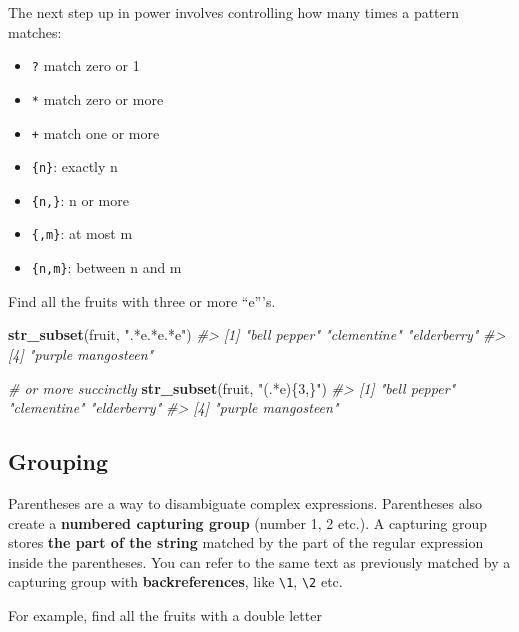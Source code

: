 \documentclass[]{book}
\newenvironment{Shaded}{\begin{snugshade}}{\end{snugshade}}
\newcommand{\KeywordTok}[1]{\textcolor[rgb]{0.13,0.29,0.53}{\textbf{#1}}}
\newcommand{\StringTok}[1]{\textcolor[rgb]{0.31,0.60,0.02}{#1}}
\newcommand{\CommentTok}[1]{\textcolor[rgb]{0.56,0.35,0.01}{\textit{#1}}}
\newcommand{\NormalTok}[1]{#1}
\providecommand{\tightlist}{%
  \setlength{\itemsep}{0pt}\setlength{\parskip}{0pt}}
\theoremstyle{definition}
\theoremstyle{definition}
\theoremstyle{definition}
\theoremstyle{remark}
\begin{document}
The next step up in power involves controlling how many times a pattern
matches:

\begin{itemize}
\tightlist
\item
  \texttt{?} match zero or 1
\item
  \texttt{*} match zero or more
\item
  \texttt{+} match one or more
\item
  \texttt{\{n\}}: exactly n
\item
  \texttt{\{n,\}}: n or more
\item
  \texttt{\{,m\}}: at most m
\item
  \texttt{\{n,m\}}: between n and m
\end{itemize}

Find all the fruits with three or more ``e'''s.

\begin{Shaded}
\begin{Highlighting}[]
\KeywordTok{str_subset}\NormalTok{(fruit, }\StringTok{".*e.*e.*e"}\NormalTok{) }
\CommentTok{#> [1] "bell pepper"       "clementine"        "elderberry"       }
\CommentTok{#> [4] "purple mangosteen"}

\CommentTok{# or more succinctly}
\KeywordTok{str_subset}\NormalTok{(fruit, }\StringTok{"(.*e)\{3,\}"}\NormalTok{)}
\CommentTok{#> [1] "bell pepper"       "clementine"        "elderberry"       }
\CommentTok{#> [4] "purple mangosteen"}
\end{Highlighting}
\end{Shaded}

\subsection{Grouping}\label{grouping}

Parentheses are a way to disambiguate complex expressions. Parentheses
also create a \textbf{numbered capturing group} (number 1, 2 etc.). A
capturing group stores \textbf{the part of the string} matched by the
part of the regular expression inside the parentheses. You can refer to
the same text as previously matched by a capturing group with
\textbf{backreferences}, like \texttt{\textbackslash{}1},
\texttt{\textbackslash{}2} etc.

For example, find all the fruits with a double letter
\end{document}

